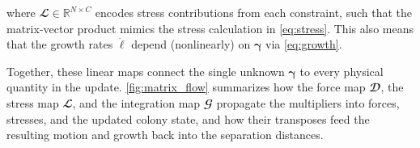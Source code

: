 \documentclass[a4paper,fleqn]{cas-dc}
\begin{document}
where $\mathbfcal{L} \in \mathbb{R}^{N \times C}$ encodes stress contributions from each constraint, such that the matrix-vector product mimics the stress calculation in \autoref{eq:stress}. This also means that the growth rates $\dot{\boldsymbol{\ell}}$ depend (nonlinearly) on $\boldsymbol{\gamma}$ via \autoref{eq:growth}.

Together, these linear maps connect the single unknown $\boldsymbol{\gamma}$ to every physical quantity in the update. \autoref{fig:matrix_flow} summarizes how the force map $\mathbfcal{D}$, the stress map $\mathbfcal{L}$, and the integration map $\mathbfcal{G}$ propagate the multipliers into forces, stresses, and the updated colony state, and how their transposes feed the resulting motion and growth back into the separation distances.

\begin{figure}[pos=htbp]
    \centering
\end{figure}
\end{document}
